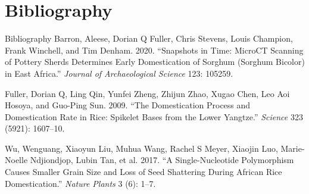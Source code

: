 \documentclass[
  ignorenonframetext,
  aspectratio=169]{beamer}
\newlength{\cslhangindent}
\newenvironment{cslreferences}%
  {\setlength{\parindent}{0pt}%
  \everypar{\setlength{\hangindent}{\cslhangindent}}\ignorespaces}%
  {\par}
\begin{document}
\hypertarget{bibliography}{%
\section*{Bibliography}\label{bibliography}}

\begin{frame}{Bibliography}
\hypertarget{refs}{}
\begin{cslreferences}
\leavevmode\hypertarget{ref-barron2020snapshots}{}%
Barron, Aleese, Dorian Q Fuller, Chris Stevens, Louis Champion, Frank
Winchell, and Tim Denham. 2020. ``Snapshots in Time: MicroCT Scanning of
Pottery Sherds Determines Early Domestication of Sorghum (Sorghum
Bicolor) in East Africa.'' \emph{Journal of Archaeological Science} 123:
105259.

\leavevmode\hypertarget{ref-fuller2009domestication}{}%
Fuller, Dorian Q, Ling Qin, Yunfei Zheng, Zhijun Zhao, Xugao Chen, Leo
Aoi Hosoya, and Guo-Ping Sun. 2009. ``The Domestication Process and
Domestication Rate in Rice: Spikelet Bases from the Lower Yangtze.''
\emph{Science} 323 (5921): 1607--10.

\leavevmode\hypertarget{ref-wu2017single}{}%
Wu, Wenguang, Xiaoyun Liu, Muhua Wang, Rachel S Meyer, Xiaojin Luo,
Marie-Noelle Ndjiondjop, Lubin Tan, et al. 2017. ``A Single-Nucleotide
Polymorphism Causes Smaller Grain Size and Loss of Seed Shattering
During African Rice Domestication.'' \emph{Nature Plants} 3 (6): 1--7.
\end{cslreferences}
\end{frame}
\end{document}
